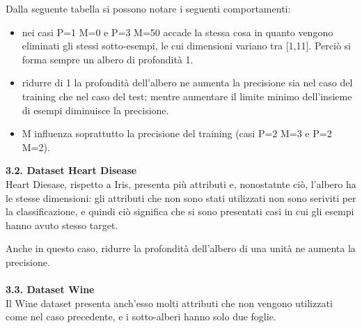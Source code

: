 \documentclass{article}
\begin{document}
Dalla seguente tabella si possono notare i seguenti comportamenti:
\begin{itemize}
	\item nei casi P=1 M=0 e P=3 M=50 accade la stessa cosa in quanto vengono eliminati gli stessi sotto-esempi, le cui dimensioni variano tra [1,11]. Perciò si forma sempre un albero di profondità 1.
	\item ridurre di 1 la profondità dell'albero ne aumenta la precisione sia nel caso del training che nel caso del test; mentre aumentare il limite minimo dell'insieme di esempi diminuisce la precisione.
	\item M influenza soprattutto la precisione del training (casi P=2 M=3 e P=2 M=2).
\end{itemize}
{\Large \textbf{{\large{3}}.{\small{2}}. Dataset Heart Disease}}\\
Heart Diesase, rispetto a Iris, presenta più attributi e, nonostatnte ciò, l'albero ha le stesse dimensioni: gli attributi che non sono stati utilizzati non sono seriviti per la classificazione, e quindi ciò significa che si sono presentati casi in cui gli esempi hanno avuto stesso target.
\begin{table}[H]
\end{table}
Anche in questo caso, ridurre la profondità dell'albero di una unità ne aumenta la precisione.\\
\\
{\Large \textbf{{\large{3}}.{\small{3}}. Dataset Wine}}\\
Il Wine dataset presenta anch'esso molti attributi che non vengono utilizzati come nel caso precedente, e i sotto-alberi hanno solo due foglie.
\end{document}
